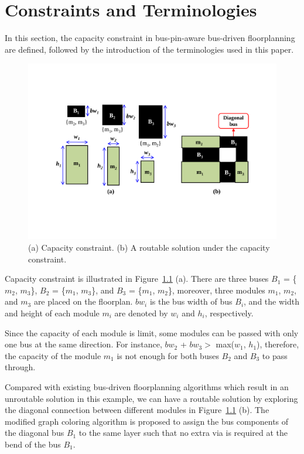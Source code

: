 \chapter{Constraints and Terminologies}
\label{chap::CONSTRAINTS AND TERMINOLOGIES}

\baselineskip=26pt
\hspace{5mm}
In this section, the capacity constraint in bus-pin-aware bus-driven floorplanning
are defined, followed by the introduction of the terminologies
used in this paper.

\begin{figure}[htb]
  \centering
    \includegraphics[width=12cm]{Fig/capacity.pdf}
  \caption{
      (a) Capacity constraint. (b) A routable solution under the capacity
      constraint.
   }
  \label{fig::capacity}
\end{figure}

Capacity constraint is illustrated in Figure~\ref{fig::capacity}
(a). There are three buses $B_1$ = \{$m_2$, $m_3$\}, $B_2$ = \{$m_1$, $m_3$\}, and
$B_3$ = \{$m_1$, $m_2$\}, moreover, three modules $m_1$, $m_2$, and $m_3$ are
placed on the floorplan. $bw_i$ is the bus width of bus
$B_i$, and the width and height of each module $m_i$ are
denoted by $w_i$ and $h_i$, respectively.

Since the capacity of each module is limit, some modules can be passed with only
one bus at the same direction. For instance, $bw_2$ + $bw_3 >$
max($w_1$, $h_1$), therefore, the capacity of the module $m_1$ is
not enough for both buses $B_2$ and $B_3$ to pass through.

Compared with existing bus-driven floorplanning algorithms which
result in an unroutable solution in this example, we can have a
routable solution by exploring the diagonal connection between
different modules in Figure~\ref{fig::capacity} (b). The modified
graph coloring algorithm is proposed to assign the bus components
of the diagonal bus $B_1$ to the same layer such that no extra via
is required at the bend of the bus $B_1$.

